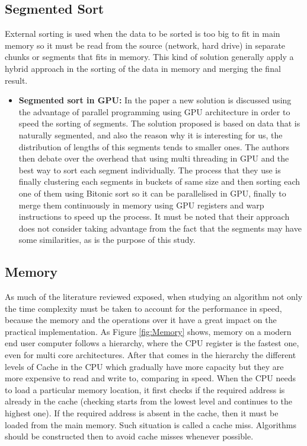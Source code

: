 \documentclass[a4paper,12pt]{article}
\begin{document}
\subsection {Segmented Sort}
External sorting is used when the data to be sorted is too big to fit in main memory so it must be read from the source (network, hard drive) in separate chunks or segments that fits in memory. This kind of solution generally apply a hybrid approach in the sorting of the data in memory and merging the final result. 

\begin{itemize}
\item {\bf Segmented sort in GPU:} In the paper \cite{hou2017fast} a new solution is discussed using the advantage of parallel programming using GPU architecture in order to speed the sorting of segments. The solution proposed is based on data that is naturally segmented, and also the reason why it is interesting for us, the distribution of lengths of this segments tends to smaller ones. The authors then debate over the overhead that using multi threading in GPU and the best way to sort each segment individually. The process that they use is finally clustering each segments in buckets of same size and then sorting each one of them using Bitonic sort \cite{batcher1968sorting} so it can be parallelised in GPU, finally to merge them continuously in memory using GPU registers and warp instructions to speed up the process. It must be noted that their approach does not consider taking advantage from the fact that the segments may have some similarities, as is the purpose of this study.
\end{itemize}

\subsection{Memory}
As much of the literature reviewed exposed, when studying an algorithm not only the time complexity must be taken to account for the performance in speed, because the memory and the operations over it have a great impact on the practical implementation. As Figure     \ref{fig:Memory} shows, memory on a modern end user computer follows a hierarchy, where the CPU register is the fastest one, even for multi core architectures. After that comes in the hierarchy the different levels of Cache in the CPU which gradually have more capacity but they are more expensive to read and write to, comparing in speed. When the CPU needs to load a particular memory location, it first checks if the required address is already in the cache (checking starts from the lowest level and continues to the highest one). If the required address is absent in the cache, then it must be loaded from the main memory. Such situation is called a cache miss. Algorithms should be constructed then to avoid cache misses whenever possible. 
\end{document}
